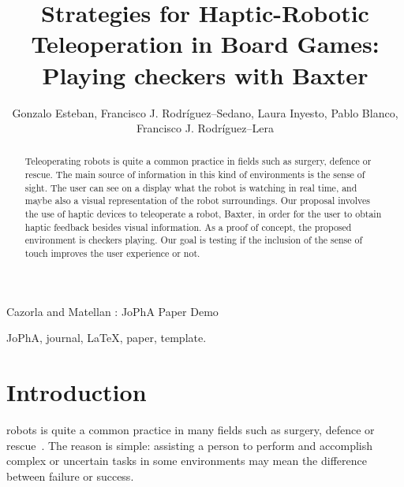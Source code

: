 \documentclass[journal,twoside]{JoPhA}
\begin{document}
\title{Strategies for Haptic-Robotic Teleoperation in Board Games: Playing checkers with Baxter}

\author{Gonzalo Esteban, Francisco J. Rodr\'{i}guez--Sedano, Laura Inyesto, Pablo Blanco, Francisco J. Rodr\'{i}guez--Lera
}


%
{Cazorla and Matellan : JoPhA Paper Demo}
\maketitle


\begin{abstract}
Teleoperating robots is quite a common practice in fields such as surgery, defence or rescue. The main source of information in this kind of environments is the sense of sight. The user can see on a display what the robot is watching in real time, and maybe also a visual representation of the robot surroundings. Our proposal involves the use of haptic devices to teleoperate a robot, Baxter, in order for the user to obtain haptic feedback besides visual information. As a proof of concept, the proposed environment is checkers playing. Our goal is testing if the inclusion of the sense of touch improves the user experience or not. 
\end{abstract}


\begin{IEEEkeywords}
JoPhA, journal, \LaTeX, paper, template.
\end{IEEEkeywords}


\section{Introduction}

   robots is quite a common practice in many fields such as surgery, defence or rescue~\cite{Vertut85}. The reason is simple: assisting a person to perform and accomplish complex or uncertain tasks in some environments may mean the difference between failure or success.
\end{document}
